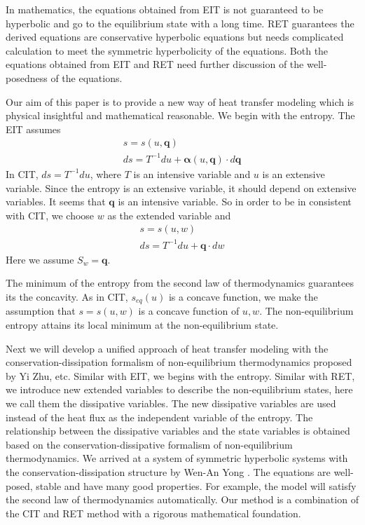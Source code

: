 \documentclass[a4paper]{article}
\begin{document}
In mathematics, the equations obtained from EIT is not guaranteed to be hyperbolic and go to the equilibrium state with a long time. RET guarantees the derived equations are conservative hyperbolic equations but needs complicated calculation to meet the symmetric hyperbolicity of the equations. Both the equations obtained from EIT and RET need further discussion of the well-posedness of the equations.

Our aim of this paper is to provide a new way of heat transfer modeling which is physical insightful and mathematical reasonable. We begin with the entropy. 
The EIT assumes 
\begin{eqnarray}
s=s(u,\mathbf{q}) \\ ds=T^{-1}du+\mathbf{\alpha}(u,\mathbf{q}) \cdot d\mathbf{q} 
\end{eqnarray}
In CIT, $ds=T^{-1}du$, where $T$ is an intensive variable and $u$ is an extensive variable. Since the entropy is an extensive variable, it should depend on extensive variables. It seems that $\mathbf{q}$ is an intensive variable. So in order to be in consistent with CIT, we choose $w$ as the extended variable and 
\begin{eqnarray}
s=s(u,w) \\ ds=T^{-1} du+\mathbf{q} \cdot dw
\end{eqnarray}
Here we assume $S_w=\mathbf{q}$. 

The minimum of the entropy from the second law of thermodynamics guarantees its the concavity. As in CIT, $s_{eq}(u)$ is a concave function, we make the assumption that $s=s(u,w)$ is a concave function of $u,w$. The non-equilibrium entropy attains its local minimum at the non-equilibrium state. 
 
 Next we will develop a unified approach of heat transfer modeling with the conservation-dissipation formalism of non-equilibrium thermodynamics proposed by Yi Zhu, etc.\cite{zhu2014conservation} Similar with EIT, we begins with the entropy. Similar with RET, we introduce new extended variables to describe the non-equilibrium states, here we call them the dissipative variables. The new dissipative variables are used instead of the heat flux as the independent variable of the entropy. The relationship between the dissipative variables and the state variables is obtained based on the conservation-dissipative formalism of non-equilibrium thermodynamics. We arrived at a system of symmetric hyperbolic systems with the conservation-dissipation structure by Wen-An Yong \cite{yong2008interesting}. The equations are well-posed, stable and have many good properties. For example, the  model will satisfy the second law of thermodynamics automatically. Our method is a combination of the CIT and RET method with a rigorous mathematical foundation. 
\end{document}
